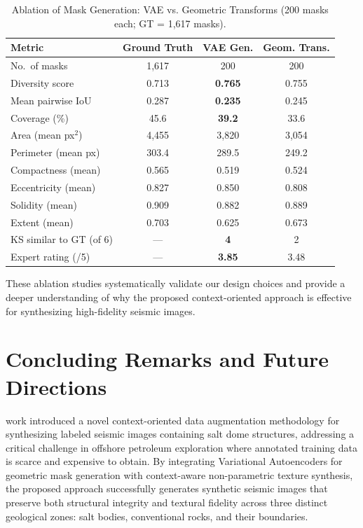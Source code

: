 \documentclass{ieeeaccess}
\begin{document}
\begin{table}[!t]
\caption{Ablation of Mask Generation: VAE vs. Geometric Transforms (200 masks each; GT = 1,617 masks).}
\label{tab:ablation_masks}
\centering
\begin{tabular}{lccc}
\toprule
\textbf{Metric} & \textbf{Ground Truth} & \textbf{VAE Gen.} & \textbf{Geom. Trans.} \\
\midrule
No.\ of masks            & 1,617  & 200    & 200    \\
Diversity score          & 0.713  & \textbf{0.765}  & 0.755  \\
Mean pairwise IoU        & 0.287  & \textbf{0.235}  & 0.245  \\
Coverage (\%)            & 45.6   & \textbf{39.2}   & 33.6   \\
\midrule
Area (mean px$^2$)       & 4,455  & 3,820  & 3,054  \\
Perimeter (mean px)      & 303.4  & 289.5  & 249.2  \\
Compactness (mean)       & 0.565  & 0.519  & 0.524  \\
Eccentricity (mean)      & 0.827  & 0.850  & 0.808  \\
Solidity (mean)          & 0.909  & 0.882  & 0.889  \\
Extent (mean)            & 0.703  & 0.625  & 0.673  \\
\midrule
KS similar to GT (of 6)  & ---    & \textbf{4}      & 2      \\
Expert rating (/5)       & ---    & \textbf{3.85}   & 3.48     \\
\bottomrule
\end{tabular}
\end{table}

These ablation studies systematically validate our design choices and provide a deeper understanding of why the proposed context-oriented approach is effective for synthesizing high-fidelity seismic images.

\section{Concluding Remarks and Future Directions}
\label{sec:conclusion}

 work introduced a novel context-oriented data augmentation methodology for synthesizing labeled seismic images containing salt dome structures, addressing a critical challenge in offshore petroleum exploration where annotated training data is scarce and expensive to obtain. By integrating Variational Autoencoders for geometric mask generation with context-aware non-parametric texture synthesis, the proposed approach successfully generates synthetic seismic images that preserve both structural integrity and textural fidelity across three distinct geological zones: salt bodies, conventional rocks, and their boundaries.
\end{document}
